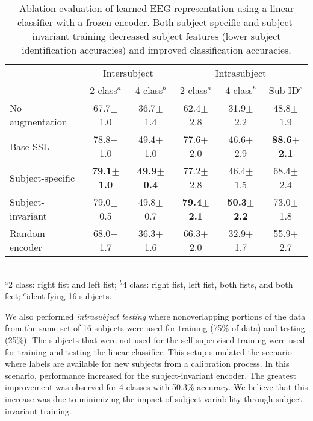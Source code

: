 \documentclass{article}
\newcommand{\std}[1]{{\scriptsize{$\pm$#1}}}
\begin{document}
\begin{table}
  \caption{Ablation evaluation of learned EEG representation using a linear
  classifier with a frozen encoder. Both subject-specific and subject-invariant
  training decreased subject features (lower subject identification accuracies)
  and improved classification accuracies.}
  \label{table:eeg:losses}
  \centering
  \small
  \begin{tabular}{lccccc}
    \toprule
    & \multicolumn{2}{c}{Intersubject} & \multicolumn{3}{c}{Intrasubject} \\
    \cmidrule(lr){2-3}\cmidrule(lr){4-6}
    & 2 class$^a$ & 4 class$^b$ & 2 class$^a$ & 4 class$^b$ & Sub ID$^c$\\
    \hline
No augmentation
& 67.7\std{1.0} & 36.7\std{1.4}
& 62.4\std{2.8} & 31.9\std{2.2}
& 48.8\std{1.9} \\

Base SSL
& 78.8\std{1.0} & 49.4\std{1.0}
& 77.6\std{2.0} & 46.6\std{2.9}
& \textbf{88.6\std{2.1}} \\



Subject-specific
& \textbf{79.1\std{1.0}} & \textbf{49.9\std{0.4}}
& 77.2\std{2.8} & 46.4\std{1.5}
& 68.4\std{2.4} \\

Subject-invariant
& 79.0\std{0.5} & 49.8\std{0.7}
& \textbf{79.4\std{2.1}} & \textbf{50.3\std{2.2}}
& 73.0\std{1.8} \\



    \hline
    Random encoder
& 68.0\std{1.7} & 36.3\std{1.6}
& 66.3\std{2.0} & 32.9\std{1.7}
& 55.9\std{2.7} \\
    \bottomrule
  \end{tabular}\\
  \footnotesize{$^a$2 class: right fist and left fist; $^b$4 class: right
  fist, left fist, both fists, and both feet; $^c$identifying 16 subjects.}
\end{table} 
We also performed \textit{intrasubject testing} where nonoverlapping portions of
the data from the same set of 16 subjects were used for training (75\% of data)
and testing (25\%). The subjects that were not used for the self-supervised
training were used for training and testing the linear classifier. This setup
simulated the scenario where labels are available for new subjects from a
calibration process. In this scenario, performance increased for the
subject-invariant encoder. The greatest improvement was observed for 4 classes
with 50.3\% accuracy. We believe that this increase was due to minimizing the
impact of subject variability through subject-invariant training.
\end{document}
